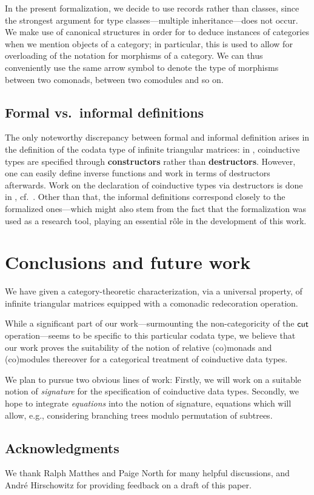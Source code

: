 \documentclass[conference,10pt]{IEEEtran}
\newcommand{\fat}[1]{\textbf{#1}}
\begin{document}
In the present formalization, we decide to use records rather than classes, since the strongest argument for type classes---multiple inheritance---does 
not occur.
We make use of canonical structures in order for \coq to deduce instances of categories when we mention objects of a category; 
in particular, this is used to allow for overloading of the notation for morphisms of a category.
We can thus conveniently use the same arrow symbol to denote the type of morphisms between two comonads, between two comodules and so on.


\subsection{Formal vs.\ informal definitions}

The only noteworthy discrepancy between formal and informal definition arises in the definition of the codata type of infinite 
triangular matrices:
in \coq, coinductive types are specified through \fat{constructors} rather than \fat{destructors}.
However, one can easily define inverse functions and work in terms of destructors afterwards.
Work on the declaration of coinductive types via destructors is done in \agda, cf.\ \parencite{DBLP:conf/popl/AbelPTS13}.
Other than that, the informal definitions correspond closely to the formalized ones---which might also stem from the fact that 
the formalization was used as a research tool, playing an essential r\^ole in the development of this work.

\section{Conclusions and future work}



We have given a category-theoretic characterization, via a universal property, of infinite triangular matrices
equipped with a comonadic redecoration operation.

While a significant part of our work---surmounting the non-categoricity of the $\mathsf{cut}$ operation---seems to be specific to this particular codata type,
we believe that our work proves the suitability of the notion of relative (co)monads and (co)modules thereover for 
a categorical treatment of coinductive data types.


We plan to pursue two obvious lines of work:
Firstly, we will work on a suitable notion of \emph{signature} for the specification of coinductive data types.
Secondly, we hope to integrate \emph{equations} into the notion of signature, equations which 
will allow, e.g., considering branching trees modulo permutation of subtrees.
 

\subsection*{Acknowledgments}
 We thank Ralph Matthes and Paige North for many helpful discussions, and Andr\'e Hirschowitz for providing feedback on
 a draft of this paper.

\printbibliography


\cleardoublepage
\appendix


\end{document}
